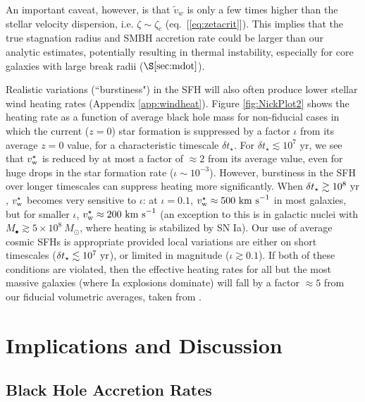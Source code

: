 \documentclass[usenatbib,fleqn]{mn2e}
\newcommand{\vw}{\tilde{v}_{w}}
\begin{document}
An important caveat, however, is that $\vw$ is only a few times higher than the stellar velocity dispersion, i.e. $\zeta \sim \zeta_c$ (eq.~[\ref{eq:zetacrit}]).  This implies that the true stagnation radius and SMBH accretion rate could be larger than our analytic estimates, potentially resulting in thermal instability, especially for core galaxies with large break radii ($\S\ref{sec:mdot}$).

Realistic variations (``burstiness") in the SFH
will also often produce lower stellar wind heating rates (Appendix
\ref{app:windheat}).  Figure \ref{fig:NickPlot2} shows the heating
rate as a function of average black hole mass for non-fiducial cases
in which the current ($z = 0$) star formation is suppressed by a
factor $\iota$ from its average $z = 0$ value, for a characteristic
timescale $\delta t_{\star}$.  For $\delta t_{\star} \lesssim 10^{7}$
yr, we see that $v_{\rm w}^{\star}$ is reduced by at most a factor of
$\approx 2$ from its average value, even for huge drops in the star
formation rate ($\iota \sim 10^{-3}$).  However, burstiness in the
SFH over longer timescales can suppress heating
more significantly.  When $\delta t_{\star} \gtrsim 10^8~{\rm yr}$,
$v_{\rm w}^\star$ becomes very sensitive to $\iota$: at $\iota=0.1$,
$v_{\rm w}^\star \approx 500~{\rm km~s}^{-1}$ in most galaxies, but
for smaller $\iota$, $v_{\rm w}^\star \approx 200~{\rm km~s}^{-1}$ (an
exception to this is in galactic nuclei with $M_\bullet \gtrsim
5\times 10^8~M_\odot$, where heating is stabilized by SN Ia).  Our use
of average cosmic SFHs is appropriate provided
local variations are either on short timescales ($\delta t_{\star}
\lesssim 10^7~{\rm yr}$), or limited in magnitude ($\iota \gtrsim
0.1$).  If both of these conditions are violated, then the effective
heating rates for all but the most massive galaxies (where Ia
explosions dominate) will fall by a factor $\approx 5$ from our
fiducial volumetric averages, taken from \citet{MosterNaab+:2013a}.


\section{Implications and Discussion}
\label{sec:discussion}

\subsection{Black Hole Accretion Rates}
\label{sec:mdot}
\end{document}
